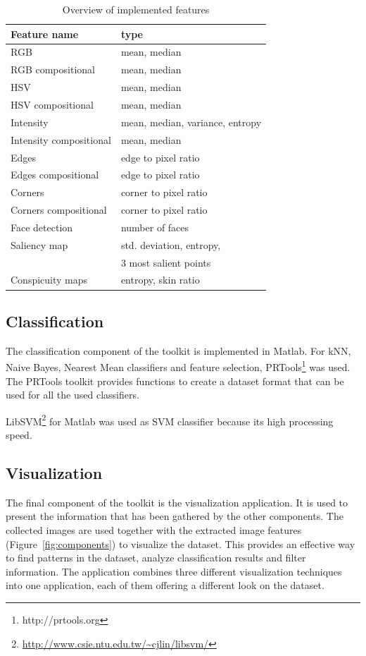 \begin{table}[htb]
    \centering
    \begin{tabular}	{ | l | l | } 
		\hline
		Feature name & type \\
		\hline
		RGB & mean, median \\
		RGB compositional & mean, median \\
		HSV & mean, median \\
		HSV compositional & mean, median \\
		Intensity & mean, median, variance, entropy \\
		Intensity compositional & mean, median \\				
		Edges & edge to pixel ratio \\
		Edges compositional & edge to pixel ratio \\
		Corners & corner to pixel ratio \\
		Corners compositional & corner to pixel ratio \\
		Face detection & number of faces \\
		Saliency map & std. deviation, entropy, \\
		& 3 most salient points  \\
		Conspicuity maps & entropy, skin ratio \\		
		\hline
    \end{tabular}
    \caption{Overview of implemented features}
    \label{tab:featurelist}
\end{table}

\subsection{Classification}
The classification component of the toolkit is implemented in Matlab.
For kNN, Naive Bayes, Nearest Mean classifiers and feature selection, PRTools\footnote{http://prtools.org} \cite{Duin00prtoolsversion} was used.
The PRTools toolkit provides functions to create a dataset format that can be used for all the used classifiers.

LibSVM\footnote{\url{http://www.csie.ntu.edu.tw/~cjlin/libsvm/}} \cite{chang2001libsvm} for Matlab was used as SVM classifier because its high processing speed.


\subsection{Visualization}
The final component of the toolkit is the visualization application.
It is used to present the information that has been gathered by the other components.
The collected images are used together with the extracted image features (Figure~\ref{fig:components}) to visualize the dataset.
This provides an effective way to find patterns in the dataset, analyze classification results and filter information.
The application combines three different visualization techniques into one application, each of them offering a different look on the dataset.

